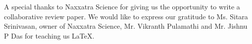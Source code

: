 A special thanks to Naxxatra Science for giving us the opportunity to write a collaborative review paper. We would like to express our gratitude to Ms. Sitara Srinivasan, owner of Naxxatra Science, Mr. Vikranth Pulamathi and Mr. Jishnu P Das for teaching us \LaTeX.